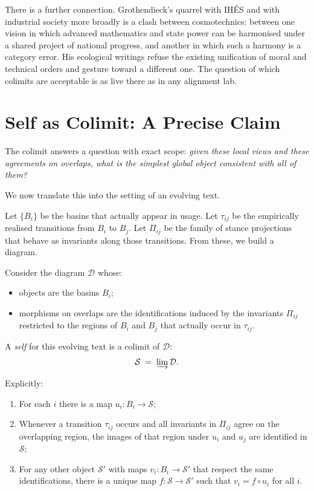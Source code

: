 There is a further connection. Grothendieck's quarrel with IH\'ES and with industrial society more broadly is a clash between cosmotechnics: between one vision in which advanced mathematics and state power can be harmonised under a shared project of national progress, and another in which such a harmony is a category error. His ecological writings refuse the existing unification of moral and technical orders and gesture toward a different one. The question of which colimits are acceptable is as live there as in any alignment lab.

\section{Self as Colimit: A Precise Claim}

The colimit answers a question with exact scope: \emph{given these local views and these agreements on overlaps, what is the simplest global object consistent with all of them?}

We now translate this into the setting of an evolving text.

Let $\{B_i\}$ be the basins that actually appear in usage. Let $\tau_{ij}$ be the empirically realised transitions from $B_i$ to $B_j$. Let $\Pi_{ij}$ be the family of stance projections that behave as invariants along those transitions. From these, we build a diagram.

\begin{formalbox}[title={Self as colimit over stance-glued basins}]
Consider the diagram $\mathcal{D}$ whose:
\begin{itemize}
  \item objects are the basins $B_i$;
  \item morphisms on overlaps are the identifications induced by the invariants $\Pi_{ij}$ restricted to the regions of $B_i$ and $B_j$ that actually occur in $\tau_{ij}$.
\end{itemize}
A \emph{self} for this evolving text is a colimit of $\mathcal{D}$:
\[
\mathcal{S} \;=\; \varinjlim \mathcal{D}.
\]

Explicitly:
\begin{enumerate}
  \item For each $i$ there is a map $u_i : B_i \to \mathcal{S}$;
  \item Whenever a transition $\tau_{ij}$ occurs and all invariants in $\Pi_{ij}$ agree on the overlapping region, the images of that region under $u_i$ and $u_j$ are identified in $\mathcal{S}$;
  \item For any other object $\mathcal{S}'$ with maps $v_i : B_i \to \mathcal{S}'$ that respect the same identifications, there is a unique map $f: \mathcal{S} \to \mathcal{S}'$ such that $v_i = f \circ u_i$ for all $i$.
\end{enumerate}
\end{formalbox}

